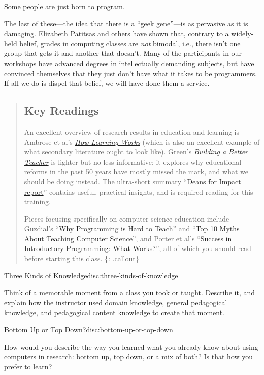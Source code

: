 Some people are just born to program.

The last of these---the idea that there is a ``geek gene''---is as
pervasive as it is damaging. Elizabeth Patitsas and others have shown
that, contrary to a widely-held belief,
\href{http://dl.acm.org/citation.cfm?id=2960312}{grades in computing
classes are \emph{not} bimodal}, i.e., there isn't one group that gets
it and another that doesn't. Many of the participants in our workshops
have advanced degrees in intellectually demanding subjects, but have
convinced themselves that they just don't have what it takes to be
programmers. If all we do is dispel that belief, we will have done them
a service.

\begin{quote}
\subsection{Key Readings}\label{key-readings}

An excellent overview of research results in education and learning is
Ambrose et al's
\emph{\href{http://www.amazon.com/How-Learning-Works-Research-Based-Jossey-Bass/dp/0470484101/}{How
Learning Works}} (which is also an excellent example of what secondary
literature ought to look like). Green's
\emph{\href{http://www.amazon.com/Building-Better-Teacher-Teaching-Everyone/dp/0393081591/}{Building
a Better Teacher}} is lighter but no less informative: it explores why
educational reforms in the past 50 years have mostly missed the mark,
and what we should be doing instead. The ultra-short summary
``\href{\{\{\%20page.root\%20\}\}/files/papers/science-of-learning-2015.pdf}{Deans
for Impact report}'' contains useful, practical insights, and is
required reading for this training.

Pieces focusing specifically on computer science education include
Guzdial's
``\href{\{\{\%20page.root\%20\}\}/files/papers/guzdial-why-hard-to-teach-2011.pdf}{Why
Programming is Hard to Teach}'' and
``\href{\{\{\%20page.root\%20\}\}/files/papers/guzdial-10-myths-2015.pdf}{Top
10 Myths About Teaching Computer Science}'', and Porter et al's
``\href{\{\{\%20page.root\%20\}\}/files/papers/porter-what-works-2013.pdf}{Success
in Introductory Programming: What Works?}'', all of which you should
read before starting this class. \{: .callout\}
\end{quote}

\begin{discussion}{Three Kinds of Knowledge}{disc:three-kinds-of-knowledge}

Think of a memorable moment from a class you took or taught. Describe
it, and explain how the instructor used domain knowledge, general
pedagogical knowledge, and pedagogical content knowledge to create that
moment.
\end{discussion}

\begin{discussion}{Bottom Up or Top Down?}{disc:bottom-up-or-top-down}

How would you describe the way you learned what you already know about
using computers in research: bottom up, top down, or a mix of both? Is
that how you prefer to learn?
\end{discussion}
